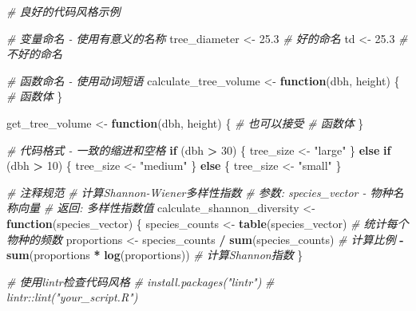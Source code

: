 \documentclass[
]{book}
\newenvironment{Shaded}{\begin{snugshade}}{\end{snugshade}}
\newcommand{\CommentTok}[1]{\textcolor[rgb]{0.56,0.35,0.01}{\textit{#1}}}
\newcommand{\ControlFlowTok}[1]{\textcolor[rgb]{0.13,0.29,0.53}{\textbf{#1}}}
\newcommand{\DecValTok}[1]{\textcolor[rgb]{0.00,0.00,0.81}{#1}}
\newcommand{\FloatTok}[1]{\textcolor[rgb]{0.00,0.00,0.81}{#1}}
\newcommand{\FunctionTok}[1]{\textcolor[rgb]{0.13,0.29,0.53}{\textbf{#1}}}
\newcommand{\NormalTok}[1]{#1}
\newcommand{\OtherTok}[1]{\textcolor[rgb]{0.56,0.35,0.01}{#1}}
\newcommand{\SpecialCharTok}[1]{\textcolor[rgb]{0.81,0.36,0.00}{\textbf{#1}}}
\newcommand{\StringTok}[1]{\textcolor[rgb]{0.31,0.60,0.02}{#1}}
\begin{document}
\begin{Shaded}
\begin{Highlighting}[]
\CommentTok{\# 良好的代码风格示例}

\CommentTok{\# 变量命名 {-} 使用有意义的名称}
\NormalTok{tree\_diameter }\OtherTok{\textless{}{-}} \FloatTok{25.3}  \CommentTok{\# 好的命名}
\NormalTok{td }\OtherTok{\textless{}{-}} \FloatTok{25.3}            \CommentTok{\# 不好的命名}

\CommentTok{\# 函数命名 {-} 使用动词短语}
\NormalTok{calculate\_tree\_volume }\OtherTok{\textless{}{-}} \ControlFlowTok{function}\NormalTok{(dbh, height) \{}
  \CommentTok{\# 函数体}
\NormalTok{\}}

\NormalTok{get\_tree\_volume }\OtherTok{\textless{}{-}} \ControlFlowTok{function}\NormalTok{(dbh, height) \{  }\CommentTok{\# 也可以接受}
  \CommentTok{\# 函数体}
\NormalTok{\}}

\CommentTok{\# 代码格式 {-} 一致的缩进和空格}
\ControlFlowTok{if}\NormalTok{ (dbh }\SpecialCharTok{\textgreater{}} \DecValTok{30}\NormalTok{) \{}
\NormalTok{  tree\_size }\OtherTok{\textless{}{-}} \StringTok{"large"}
\NormalTok{\} }\ControlFlowTok{else} \ControlFlowTok{if}\NormalTok{ (dbh }\SpecialCharTok{\textgreater{}} \DecValTok{10}\NormalTok{) \{}
\NormalTok{  tree\_size }\OtherTok{\textless{}{-}} \StringTok{"medium"}
\NormalTok{\} }\ControlFlowTok{else}\NormalTok{ \{}
\NormalTok{  tree\_size }\OtherTok{\textless{}{-}} \StringTok{"small"}
\NormalTok{\}}

\CommentTok{\# 注释规范}
\CommentTok{\# 计算Shannon{-}Wiener多样性指数}
\CommentTok{\# 参数: species\_vector {-} 物种名称向量}
\CommentTok{\# 返回: 多样性指数值}
\NormalTok{calculate\_shannon\_diversity }\OtherTok{\textless{}{-}} \ControlFlowTok{function}\NormalTok{(species\_vector) \{}
\NormalTok{  species\_counts }\OtherTok{\textless{}{-}} \FunctionTok{table}\NormalTok{(species\_vector)  }\CommentTok{\# 统计每个物种的频数}
\NormalTok{  proportions }\OtherTok{\textless{}{-}}\NormalTok{ species\_counts }\SpecialCharTok{/} \FunctionTok{sum}\NormalTok{(species\_counts)  }\CommentTok{\# 计算比例}
  \SpecialCharTok{{-}}\FunctionTok{sum}\NormalTok{(proportions }\SpecialCharTok{*} \FunctionTok{log}\NormalTok{(proportions))  }\CommentTok{\# 计算Shannon指数}
\NormalTok{\}}

\CommentTok{\# 使用lintr检查代码风格}
\CommentTok{\# install.packages("lintr")}
\CommentTok{\# lintr::lint("your\_script.R")}
\end{Highlighting}
\end{Shaded}
\end{document}
